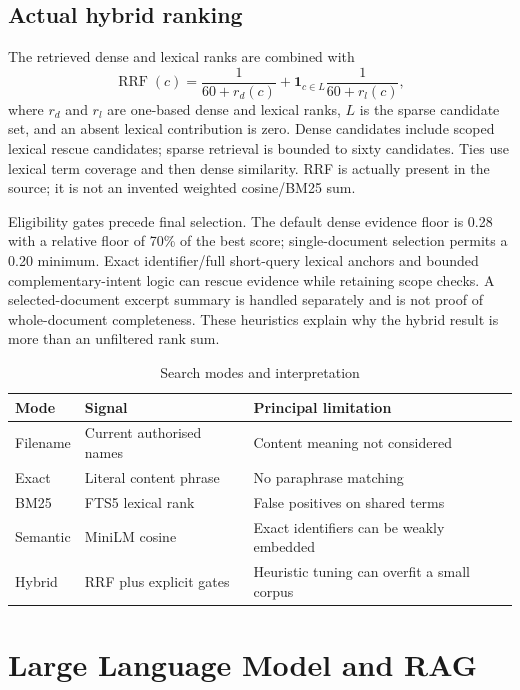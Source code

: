 \documentclass[11pt,a4paper,oneside]{report}
\begin{document}
\section{Actual hybrid ranking}
The retrieved dense and lexical ranks are combined with
\begin{equation}\operatorname{RRF}(c)=\frac{1}{60+r_d(c)}+\mathbf{1}_{c\in L}\frac{1}{60+r_l(c)},\end{equation}
where $r_d$ and $r_l$ are one-based dense and lexical ranks, $L$ is the sparse candidate set, and an absent lexical contribution is zero. Dense candidates include scoped lexical rescue candidates; sparse retrieval is bounded to sixty candidates. Ties use lexical term coverage and then dense similarity. RRF is actually present in the source; it is not an invented weighted cosine/BM25 sum.

Eligibility gates precede final selection. The default dense evidence floor is 0.28 with a relative floor of 70\% of the best score; single-document selection permits a 0.20 minimum. Exact identifier/full short-query lexical anchors and bounded complementary-intent logic can rescue evidence while retaining scope checks. A selected-document excerpt summary is handled separately and is not proof of whole-document completeness. These heuristics explain why the hybrid result is more than an unfiltered rank sum.
\par\begin{table}[htbp]\caption{Search modes and interpretation}\small\begin{tabularx}{\linewidth}{lYY}\toprule Mode&Signal&Principal limitation\\\midrule Filename&Current authorised names&Content meaning not considered\\Exact&Literal content phrase&No paraphrase matching\\BM25&FTS5 lexical rank&False positives on shared terms\\Semantic&MiniLM cosine&Exact identifiers can be weakly embedded\\Hybrid&RRF plus explicit gates&Heuristic tuning can overfit a small corpus\\\bottomrule\end{tabularx}\end{table}\par
\FloatBarrier

\chapter{Large Language Model and RAG}
\end{document}
